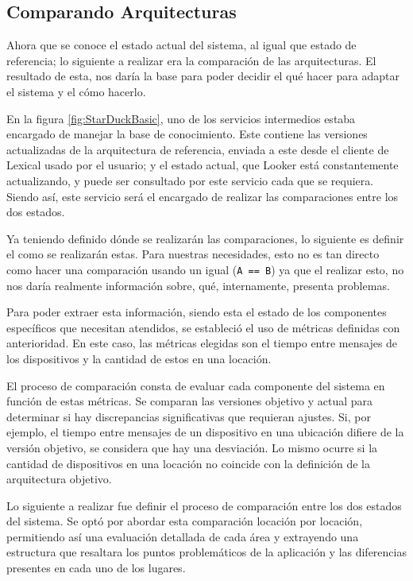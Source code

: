 \subsection{Comparando Arquitecturas}

Ahora que se conoce el estado actual del sistema, al igual que estado de referencia; lo siguiente a realizar era la comparación de las arquitecturas. El resultado de esta, nos daría la base para poder decidir el qué hacer para adaptar el sistema y el cómo hacerlo.

En la figura \ref{fig:StarDuckBasic}, uno de los servicios intermedios estaba encargado de manejar la base de conocimiento. Este contiene las versiones actualizadas de la arquitectura de referencia, enviada a este desde el cliente de Lexical usado por el usuario; y el estado actual, que Looker está constantemente actualizando, y puede ser consultado por este servicio cada que se requiera. Siendo así, este servicio será el encargado de realizar las comparaciones entre los dos estados.

Ya teniendo definido dónde se realizarán las comparaciones, lo siguiente es definir el como se realizarán estas. Para nuestras necesidades, esto no es tan directo como hacer una comparación usando un igual (\texttt{A == B}) ya que el realizar esto, no nos daría realmente información sobre, qué, internamente, presenta problemas.

Para poder extraer esta información, siendo esta el estado de los componentes específicos que necesitan atendidos, se estableció el uso de métricas definidas con anterioridad. En este caso, las métricas elegidas son el tiempo entre mensajes de los dispositivos y la cantidad de estos en una locación.

El proceso de comparación consta de evaluar cada componente del sistema en función de estas métricas. Se comparan las versiones objetivo y actual para determinar si hay discrepancias significativas que requieran ajustes. Si, por ejemplo, el tiempo entre mensajes de un dispositivo en una ubicación difiere de la versión objetivo, se considera que hay una desviación. Lo mismo ocurre si la cantidad de dispositivos en una locación no coincide con la definición de la arquitectura objetivo.

Lo siguiente a realizar fue definir el proceso de comparación entre los dos estados del sistema. Se optó por abordar esta comparación locación por locación, permitiendo así una evaluación detallada de cada área y extrayendo una estructura que resaltara los puntos problemáticos de la aplicación y las diferencias presentes en cada uno de los lugares. 


